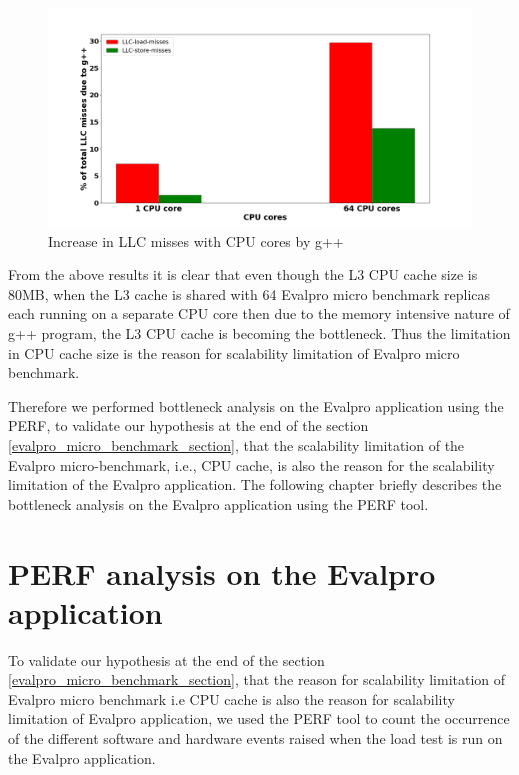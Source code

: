 \documentclass{iitbreport}
\begin{document}
\begin{figure}[!htb]
  \centering
  \includegraphics[width=\linewidth]{Images/llc_misses_g++.png}
  \caption{Increase in LLC misses with CPU cores by g++ }
  \label{llc_misses_gplusplus}
\end{figure}


From the above results it is clear that even though the L3 CPU cache size is 80MB,  when the L3 cache is shared with 64 Evalpro micro benchmark replicas each running on a separate CPU core then due to the memory intensive nature of g++ program, the L3 CPU cache is becoming the bottleneck. Thus the limitation in CPU cache size is the reason for scalability limitation of Evalpro micro benchmark.

Therefore we performed bottleneck analysis on the Evalpro application using the PERF, to validate our hypothesis at the end of the section \ref{evalpro_micro_benchmark_section},  that the scalability limitation of the Evalpro micro-benchmark, i.e., CPU cache, is also the reason for the scalability limitation of the Evalpro application. The following chapter briefly describes the  bottleneck analysis on the Evalpro application using the PERF tool.


\chapter{PERF analysis on the Evalpro application}\label{perf_evalpro_application}

To validate our hypothesis at the end of the section \ref{evalpro_micro_benchmark_section},  that the reason for scalability limitation of Evalpro micro benchmark  i.e  CPU cache is also the reason for scalability limitation of Evalpro application, we used the  PERF tool to count the occurrence of the different software and hardware events  raised when the load test is run on the Evalpro application.
\end{document}
